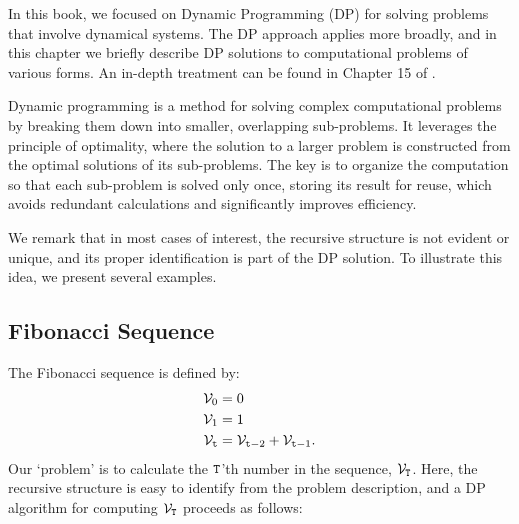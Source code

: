 In this book, we focused on Dynamic Programming (DP) for solving problems that involve dynamical systems. The DP approach applies more broadly, and in this chapter we briefly describe DP solutions to computational problems of various forms. An in-depth treatment can be found in Chapter 15 of \cite{BookCormenLRS2009}.



Dynamic programming is a method for solving complex computational problems by breaking them down into smaller, overlapping sub-problems. 
It leverages the principle of optimality, where the solution to a larger problem is constructed from the optimal solutions of its sub-problems. 
The key is to organize the computation so that each sub-problem is solved only once, storing its result for reuse, which avoids redundant calculations and significantly improves efficiency.

We remark that in most cases of interest, the recursive structure is not evident or unique, and its proper identification is part of the DP solution. To illustrate this idea, we present several examples.

\subsection*{Fibonacci Sequence}
The Fibonacci sequence is defined by:
\begin{equation*}
    \begin{split}
        \mathcal{V}_{0} &= 0 \\ 
        \mathcal{V}_1 &= 1 \\
        \mathcal{V}_{{\tt t}} &= \mathcal{V}_{{{\tt t}}-2} + \mathcal{V}_{{{\tt t}}-1}.
    \end{split}
\end{equation*}
Our `problem' is to calculate the ${\tt T}$'th number in the sequence, $\mathcal{V}_{{\tt T}}$. Here, the recursive structure is easy to identify from the problem description, and a DP algorithm for computing $\mathcal{V}_{{\tt T}}$ proceeds as follows:


